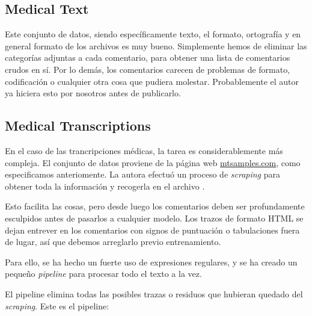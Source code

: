 \subsection{Medical Text}
Este conjunto de datos, siendo específicamente texto, el formato, ortografía y en general formato de los archivos es muy bueno. Simplemente hemos de eliminar las categorías adjuntas a cada comentario, para obtener una lista de comentarios crudos en sí. Por lo demás, los comentarios carecen de problemas de formato, codificación o cualquier otra cosa que pudiera molestar. Probablemente el autor ya hiciera esto por nosotros antes de publicarlo.


\subsection{Medical Transcriptions}
En el caso de las trancripciones médicas, la tarea es considerablemente más compleja. El conjunto de datos proviene de la página web \url{mtsamples.com}, como especificamos anteriomente. La autora efectuó un proceso de \textit{scraping} para obtener toda la información y recogerla en el archivo . 

Esto facilita las cosas, pero desde luego los comentarios deben ser profundamente esculpidos antes de pasarlos a cualquier modelo. Los trazos de formato HTML se dejan entrever en los comentarios con signos de puntuación o tabulaciones fuera de lugar, así que debemos arreglarlo previo entrenamiento.

Para ello, se ha hecho un fuerte uso de expresiones regulares, y se ha creado un pequeño \textit{pipeline} para procesar todo el texto a la vez.

El pipeline elimina todas las posibles trazas o residuos que hubieran quedado del \textit{scraping}. Este es el pipeline:


